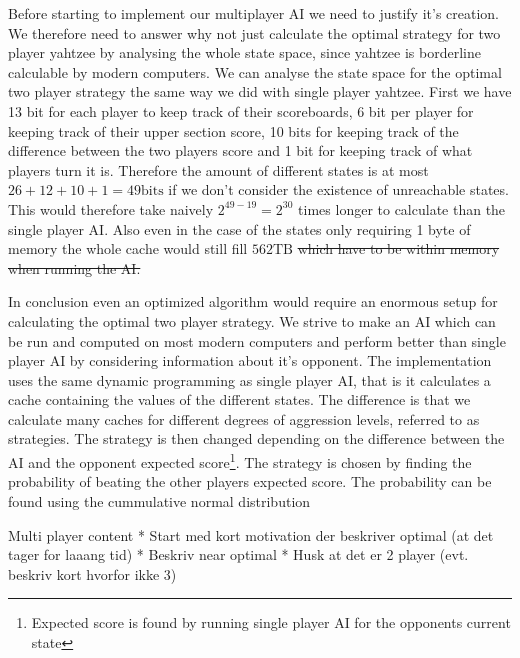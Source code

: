 Before starting to implement our multiplayer AI we need to justify it's creation. We therefore need to answer why not just calculate the optimal strategy for two player yahtzee by analysing the whole state space, since yahtzee is borderline calculable by modern computers. We can analyse the state space for the optimal two player strategy the same way we did with single player yahtzee. First we have 13 bit for each player to keep track of their scoreboards, 6 bit per player for keeping track of their upper section score, 10 bits for keeping track of the difference between the two players score and 1 bit for keeping track of what players turn it is. Therefore the amount of different states is at most $26+12+10+1 = 49\mbox{bits}$ if we don't consider the existence of unreachable states. This would therefore take naively $2^{49-19} = 2^{30}$ times longer to calculate than the single player AI. Also even in the case of the states only requiring 1 byte of memory the whole cache would still fill $562 \mbox{TB}$ \st{which have to be within memory when running the AI.} 

In conclusion even an optimized algorithm would require an enormous setup for calculating the optimal two player strategy. We strive to make an AI which can be run and computed on most modern computers and perform better than single player AI by considering information about it's opponent. The implementation uses the same dynamic programming as single player AI, that is it calculates a cache containing the values of the different states. The difference is that we calculate many caches for different degrees of aggression levels, referred to as strategies. The strategy is then changed depending on the difference between the AI and the opponent expected score\footnote{Expected score is found by running single player AI for the opponents current state}. The strategy is chosen by finding the probability of beating the other players expected score. The probability can be found using the cummulative normal distribution 

Multi player content
* Start med kort motivation der beskriver optimal (at det tager for laaang tid)
* Beskriv near optimal
* Husk at det er 2 player (evt. beskriv kort hvorfor ikke 3)
